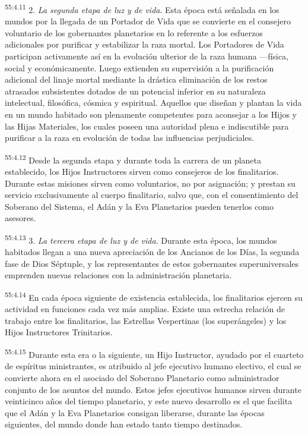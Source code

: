 \par
\textsuperscript{55:4.11} 2. \textit{La segunda etapa de luz y de vida}. Esta época está señalada en los mundos por la llegada de un Portador de Vida que se convierte en el consejero voluntario de los gobernantes planetarios en lo referente a los esfuerzos adicionales por purificar y estabilizar la raza mortal. Los Portadores de Vida participan activamente así en la evolución ulterior de la raza humana ---física, social y económicamente. Luego extienden su supervisión a la purificación adicional del linaje mortal mediante la drástica eliminación de los restos atrasados subsistentes dotados de un potencial inferior en su naturaleza intelectual, filosófica, cósmica y espiritual. Aquellos que diseñan y plantan la vida en un mundo habitado son plenamente competentes para aconsejar a los Hijos y las Hijas Materiales, los cuales poseen una autoridad plena e indiscutible para purificar a la raza en evolución de todas las influencias perjudiciales.

\par
\textsuperscript{55:4.12} Desde la segunda etapa y durante toda la carrera de un planeta establecido, los Hijos Instructores sirven como consejeros de los finalitarios. Durante estas misiones sirven como voluntarios, no por asignación; y prestan su servicio exclusivamente al cuerpo finalitario, salvo que, con el consentimiento del Soberano del Sistema, el Adán y la Eva Planetarios pueden tenerlos como asesores.

\par
\textsuperscript{55:4.13} 3. \textit{La tercera etapa de luz y de vida}. Durante esta época, los mundos habitados llegan a una nueva apreciación de los Ancianos de los Días, la segunda fase de Dios Séptuple, y los representantes de estos gobernantes superuniversales emprenden nuevas relaciones con la administración planetaria.

\par
\textsuperscript{55:4.14} En cada época siguiente de existencia establecida, los finalitarios ejercen su actividad en funciones cada vez más amplias. Existe una estrecha relación de trabajo entre los finalitarios, las Estrellas Vespertinas (los superángeles) y los Hijos Instructores Trinitarios.

\par
\textsuperscript{55:4.15} Durante esta era o la siguiente, un Hijo Instructor, ayudado por el cuarteto de espíritus ministrantes, es atribuido al jefe ejecutivo humano electivo, el cual se convierte ahora en el asociado del Soberano Planetario como administrador conjunto de los asuntos del mundo. Estos jefes ejecutivos humanos sirven durante veinticinco años del tiempo planetario, y este nuevo desarrollo es el que facilita que el Adán y la Eva Planetarios consigan liberarse, durante las épocas siguientes, del mundo donde han estado tanto tiempo destinados.

